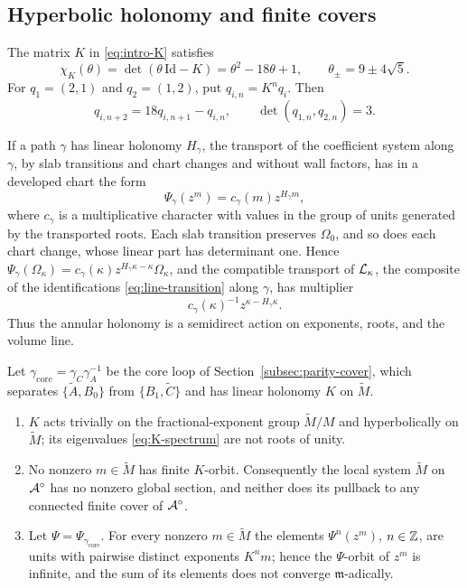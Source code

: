 \subsection{Hyperbolic holonomy and finite covers}
\label{subsec:core-holonomy}

The matrix $K$ in \eqref{eq:intro-K} satisfies
\begin{equation}\label{eq:K-spectrum}
 \chi_K(\theta)=\det(\theta\,\mathrm{Id}-K)=\theta^2-18\theta+1,
 \qquad \theta_\pm=9\pm4\sqrt5.
\end{equation}
For $q_1=(2,1)$ and $q_2=(1,2)$, put $q_{i,n}=K^nq_i$.  Then
\begin{equation}\label{eq:Pell-recurrence}
 q_{i,n+2}=18q_{i,n+1}-q_{i,n},
 \qquad \det(q_{1,n},q_{2,n})=3.
\end{equation}

If a path $\gamma$ has linear holonomy $H_\gamma$, the transport of the
coefficient system along $\gamma$, by slab transitions and chart changes and
without wall factors, has in a developed chart the form
\begin{equation}\label{eq:coefficient-holonomy}
 \Psi_\gamma(z^m)=c_\gamma(m)z^{H_\gamma m},
\end{equation}
where $c_\gamma$ is a multiplicative character with values in the group of
units generated by the transported roots.  Each slab transition preserves
$\Omega_0$, and so does each chart change, whose linear part has determinant
one.  Hence
$\Psi_\gamma(\Omega_\kappa)=c_\gamma(\kappa)z^{H_\gamma\kappa-\kappa}\Omega_\kappa$,
and the compatible transport of $\mathcal L_\kappa$, the composite of the
identifications \eqref{eq:line-transition} along $\gamma$, has multiplier
\begin{equation}\label{eq:line-holonomy}
 c_\gamma(\kappa)^{-1}z^{\kappa-H_\gamma\kappa}.
\end{equation}
Thus the annular holonomy is a semidirect action on exponents, roots, and the
volume line.

\begin{theorem}\label{thm:theta-local-system}
Let $\gamma_{\mathrm{core}}=\gamma_C\gamma_A^{-1}$ be the core loop of
Section~\ref{subsec:parity-cover}, which separates $\{\widetilde A,B_0\}$
from $\{B_1,\widetilde C\}$ and has linear holonomy $K$ on
$\widetilde M$.
\begin{enumerate}
\item $K$ acts trivially on the fractional-exponent group
$\widetilde M/M$ and hyperbolically on $\widetilde M$; its
eigenvalues \eqref{eq:K-spectrum} are not roots of unity.
\item No nonzero $m\in\widetilde M$ has finite $K$-orbit.  Consequently the
local system $\widetilde M$ on $\mathcal A^\circ$ has no nonzero global section,
and neither does its pullback to any connected finite cover of
$\mathcal A^\circ$.
\item Let $\Psi=\Psi_{\gamma_{\mathrm{core}}}$.  For every nonzero
$m\in\widetilde M$ the elements $\Psi^n(z^m)$, $n\in\mathbb Z$, are units with
pairwise distinct exponents $K^nm$; hence the $\Psi$-orbit of $z^m$ is
infinite, and the sum of its elements does not converge $\mathfrak m$-adically.
\end{enumerate}
\end{theorem}


